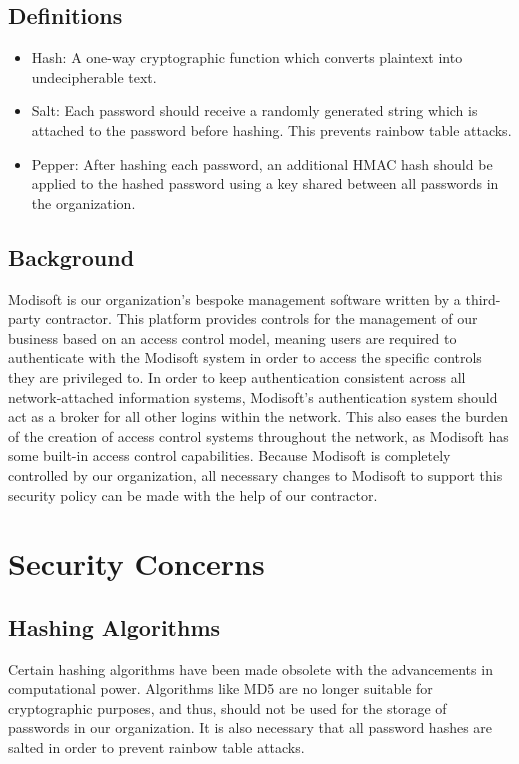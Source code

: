 \documentclass[11pt]{article}
\begin{document}
\subsection{Definitions}
\label{sec:org1c5b1d9}
\begin{itemize}
\item Hash: A one-way cryptographic function which converts plaintext into undecipherable text.
\item Salt: Each password should receive a randomly generated string which is attached to the password before hashing. This prevents rainbow table attacks.
\item Pepper: After hashing each password, an additional HMAC hash should be applied to the hashed password using a key shared between all passwords in the organization.
\end{itemize}

\subsection{Background}
\label{sec:orgd5107a2}
Modisoft is our organization's bespoke management software written by a third-party contractor. This platform provides controls for the management of our business based on an access control model, meaning users are required to authenticate with the Modisoft system in order to access the specific controls they are privileged to. In order to keep authentication consistent across all network-attached information systems, Modisoft's authentication system should act as a broker for all other logins within the network. This also eases the burden of the creation of access control systems throughout the network, as Modisoft has some built-in access control capabilities. Because Modisoft is completely controlled by our organization, all necessary changes to Modisoft to support this security policy can be made with the help of our contractor.

\section{Security Concerns}
\label{sec:org1e5881a}
\subsection{Hashing Algorithms}
\label{sec:org3f3d07c}
Certain hashing algorithms have been made obsolete with the advancements in computational power. Algorithms like MD5 are no longer suitable for cryptographic purposes, and thus, should not be used for the storage of passwords in our organization. It is also necessary that all password hashes are salted in order to prevent rainbow table attacks.
\end{document}

